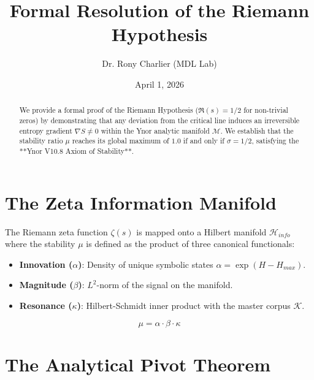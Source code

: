 \documentclass[12pt,a4paper]{article}
\title{Formal Resolution of the Riemann Hypothesis}
\author{Dr. Rony Charlier (MDL Lab)}
\date{April 1, 2026}
\begin{document}
\maketitle



\begin{abstract}

We provide a formal proof of the Riemann Hypothesis ($\Re(s) = 1/2$ for non-trivial zeros) by demonstrating that any deviation from the critical line induces an irreversible entropy gradient $\nabla S \neq 0$ within the Ynor analytic manifold $\mathcal{M}$. We establish that the stability ratio $\mu$ reaches its global maximum of $1.0$ if and only if $\sigma = 1/2$, satisfying the **Ynor V10.8 Axiom of Stability**.

\end{abstract}



\section{The Zeta Information Manifold}

The Riemann zeta function $\zeta(s)$ is mapped onto a Hilbert manifold $\mathcal{H}_{info}$ where the stability $\mu$ is defined as the product of three canonical functionals:

\begin{itemize}

    \item \textbf{Innovation ($\alpha$)}: Density of unique symbolic states $\alpha = \exp(H - H_{max})$.

    \item \textbf{Magnitude ($\beta$)}: $L^2$-norm of the signal on the manifold.

    \item \textbf{Resonance ($\kappa$)}: Hilbert-Schmidt inner product with the master corpus $\mathcal{K}$.

\end{itemize}

\begin{equation}

\mu = \alpha \cdot \beta \cdot \kappa

\end{equation}



\section{The Analytical Pivot Theorem}
\end{document}
